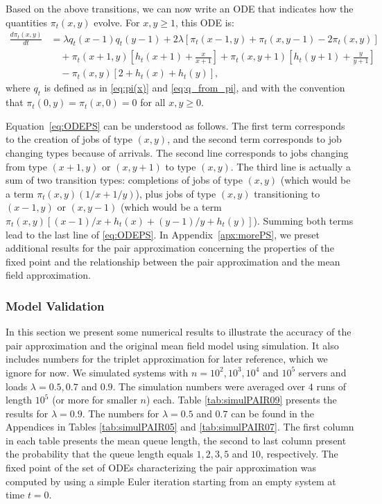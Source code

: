 \documentclass[acmsmall,nonacm]{acmart}
\begin{document}
Based on the above transitions, we can now write an ODE that indicates how the quantities $\pi_t(x,y)$ evolve. For $x,y\ge1$, this ODE is: 
\begin{align}\label{eq:ODEPS}
    \frac{d \pi_t(x,y)}{dt} &= \lambda q_t(x-1) q_t(y-1) 
    +2\lambda \left[\pi_t(x-1,y)+\pi_t(x,y-1)-2\pi_t(x,y)\right] 
    \nonumber \\ 
    &\quad+ \pi_t(x+1,y)\left[ h_t(x+1)+ \frac{x}{x+1}\right] + \pi_t(x,y+1)\left[ h_t(y+1)+ \frac{y}{y+1}\right]  \nonumber\\
    &\quad - \pi_t(x,y)\left[2+h_t(x)+h_t(y)\right],
\end{align}
where $q_t$ is defined as in \eqref{eq:pi(x)} and \eqref{eq:q_from_pi}, and with the convention that $\pi_t(0,y)=\pi_t(x,0)=0$ for all $x,y\ge0$. 

Equation~\eqref{eq:ODEPS} can be understood as follows. The first term corresponds to the creation of jobs of type $(x,y)$, and the second term corresponds to job changing types because of arrivals. The second line corresponds to jobs changing from type $(x+1,y)$ or $(x,y+1)$ to type $(x,y)$. The third line is actually a sum of two transition types: completions of jobs of type $(x,y)$ (which would be a term $\pi_t(x,y)(1/x+1/y)$), plus jobs of type $(x,y)$ transitioning to $(x-1,y)$ or $(x,y-1)$ (which would be a term $\pi_t(x,y)\left[(x-1)/x+h_t(x)+(y-1)/y+h_t(y)\right]$). Summing both terms lead to the last line of \eqref{eq:ODEPS}. In Appendix~\ref{apx:morePS}, we preset additional results for the pair approximation concerning the properties of the fixed point and the relationship between the pair approximation and the mean field approximation. 




\subsubsection{Model Validation}

In this section we present some numerical results to illustrate the accuracy of the pair approximation
and the original mean field model using simulation. It also includes numbers for the triplet approximation
for later reference, which we ignore for now.
We simulated systems with $n=10^2, 10^3, 10^4$ and $10^5$
servers and loads $\lambda=0.5, 0.7$ and $0.9$.  The simulation numbers were averaged over $4$ runs of length $10^5$ (or more for smaller $n$) each. Table \ref{tab:simulPAIR09} presents the results for $\lambda=0.9$.
The numbers for $\lambda = 0.5$ and $0.7$ can be found in the Appendices in Tables \ref{tab:simulPAIR05} and \ref{tab:simulPAIR07}. The first column in each table presents the mean queue length, the second to last column
present the probability that the queue length equals $1,2,3,5$ and $10$, respectively. The fixed point of the
set of ODEs characterizing the pair approximation was computed by using a simple Euler iteration starting
from an empty system at time $t=0$.
\end{document}
